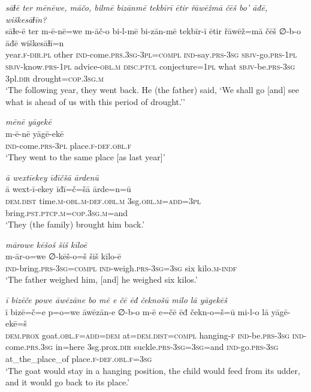 \ea \label{ZB.46}
\textit{sāɫē ter mēnēwe, māčo, bilmē bizānmē tekbīrī ētir řāwēžmā čēš bo’ āđē, wiškesāɫīn?} \\ 
\gll sāɫe-ē ter m-ē-nē=we m-āč-o bi-l-mē bi-zān-mē tekbīr-ī ētir řāwēž=mā čēš ∅-b-o āđē wiškesāɫī=n \\ 
 year\textsc{.f}\textsc{-dir}\textsc{.pl} other \textsc{ind-}come\textsc{.prs}\textsc{.3sg}\textsc{-3pl}\textsc{=compl} \textsc{ind-}say\textsc{.prs}\textsc{-3sg} \textsc{sbjv-}go\textsc{.prs}\textsc{-1pl} \textsc{sbjv-}know\textsc{.prs}\textsc{-1pl} advice\textsc{-obl}\textsc{.m} \textsc{disc.ptcl} conjecture\textsc{=1pl} what \textsc{sbjv-}be\textsc{.prs}\textsc{-3sg} 3pl\textsc{.dir} drought\textsc{=cop}\textsc{.3sg}\textsc{.m} \\ 
\glt `The following year, they went back. He (the father) said, ‘We shall go [and] see what is ahead of us with this period of drought.’'
\z 
 
\ea \label{ZB.47}
\textit{mēnē yāgekē} \\ 
\gll m-ē-nē yāgē-ekē \\ 
 \textsc{ind-}come\textsc{.prs}\textsc{-3pl} place\textsc{.f}\textsc{-def}\textsc{.obl}\textsc{.f} \\ 
\glt `They went to the same place [as last year]'
\z 
 
\ea \label{ZB.50}
\textit{ā wextīekey īđīčšā ārdenū} \\ 
\gll ā wext-ī-ekey īđī=č=šā ārde=n=ū \\ 
 \textsc{dem.dist} time\textsc{.m}\textsc{-obl}\textsc{.m}\textsc{-def}\textsc{.obl}\textsc{.m} 3sg\textsc{.obl}\textsc{.m}\textsc{=add}\textsc{=3pl} bring\textsc{.pst}\textsc{.ptcp}\textsc{.m}\textsc{=cop}\textsc{.3sg}\textsc{.m}=and \\ 
\glt `They (the family) brought him back.'
\z 
 
\ea \label{ZB.51}
\textit{mārowe kēšoš šiš kīloē} \\ 
\gll m-ār-o=we ∅-kēš-o=š šiš kīlo-ē \\ 
 \textsc{ind-}bring\textsc{.prs}\textsc{-3sg}\textsc{=compl} \textsc{ind-}weigh\textsc{.prs}\textsc{-3sg}\textsc{=3sg} six kilo\textsc{.m}\textsc{-indf} \\ 
\glt `The father weighed him, [and] he weighed six kilos.'
\z 
 
\ea \label{ZB.54}
\textit{ī bizēče powe āwēzāne bo mē e čē ēđ čeknošū milo lā yāgekēš} \\ 
\gll ī bizē=č=e p=o=we āwēzān-e ∅-b-o m-ē e=čē ēđ čekn-o=š=ū mi-l-o lā yāgē-ekē=š \\ 
 \textsc{dem.prox} goat\textsc{.obl}\textsc{.f}\textsc{=add}\textsc{=dem} at=\textsc{dem.dist}\textsc{=compl} hanging\textsc{-f} \textsc{ind-}be\textsc{.prs}\textsc{-3sg} \textsc{ind-}come\textsc{.prs}\textsc{.3sg} in=here 3sg.prox\textsc{.dir} suckle\textsc{.prs}\textsc{-3sg}\textsc{=3sg}=and \textsc{ind-}go\textsc{.prs}\textsc{-3sg} at\_the\_place\_of place\textsc{.f}\textsc{-def}\textsc{.obl}\textsc{.f}\textsc{=3sg} \\ 
\glt `The goat would stay in a hanging position, the child would feed from its udder, and it would go back to its place.'
\z 
 
